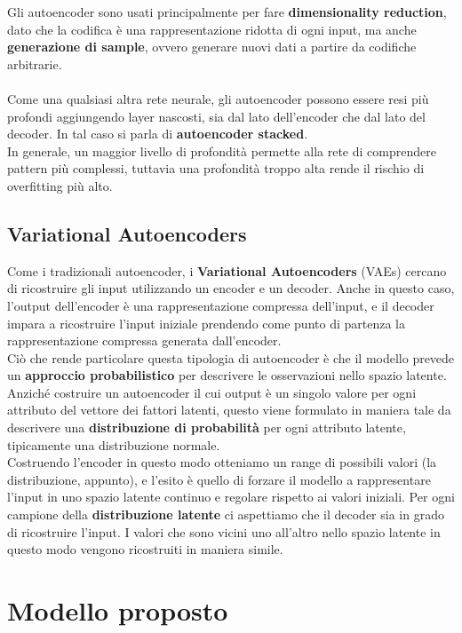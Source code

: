 Gli autoencoder sono usati principalmente per fare \textbf{dimensionality reduction}, dato che la codifica è una rappresentazione ridotta di ogni input, ma anche \textbf{generazione di sample}, ovvero generare nuovi dati a partire da codifiche arbitrarie.\\
\\
Come una qualsiasi altra rete neurale, gli autoencoder possono essere resi più profondi aggiungendo layer nascosti, sia dal lato dell'encoder che dal lato del decoder. In tal caso si parla di \textbf{autoencoder stacked}.\\
In generale, un maggior livello di profondità permette alla rete di comprendere pattern più complessi, tuttavia una profondità troppo alta rende il rischio di overfitting più alto.

\subsection{Variational Autoencoders}
Come i tradizionali autoencoder, i \textbf{Variational Autoencoders} (VAEs) cercano di ricostruire gli input utilizzando un encoder e un decoder. Anche in questo caso, l'output dell'encoder è una rappresentazione compressa dell'input, e il decoder impara a ricostruire l'input iniziale prendendo come punto di partenza la rappresentazione compressa generata dall'encoder.\\
Ciò che rende particolare questa tipologia di autoencoder è che il modello prevede un \textbf{approccio probabilistico} per descrivere le osservazioni nello spazio latente.\\
Anziché costruire un autoencoder il cui output è un singolo valore per ogni attributo del vettore dei fattori latenti, questo viene formulato in maniera tale da descrivere una \textbf{distribuzione di probabilità} per ogni attributo latente, tipicamente una distribuzione normale.\\
Costruendo l'encoder in questo modo otteniamo un range di possibili valori (la distribuzione, appunto), e l'esito è quello di forzare il modello a rappresentare l'input in uno spazio latente continuo e regolare rispetto ai valori iniziali. Per ogni campione della \textbf{distribuzione latente} ci aspettiamo che il decoder sia in grado di ricostruire l'input. I valori che sono vicini uno all'altro nello spazio latente in questo modo vengono ricostruiti in maniera simile. 

\section{Modello proposto}
